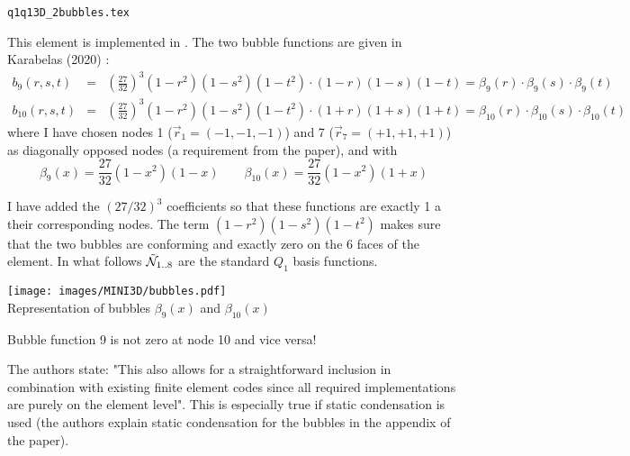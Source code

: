 \begin{flushright} {\tiny {\color{gray} \tt q1q13D\_2bubbles.tex}} \end{flushright}

This element is implemented in .
The two bubble functions are given in Karabelas \etal (2020) \cite{kahp20}:
\begin{eqnarray}
b_9(r,s,t) &=& \left(\frac{27}{32}\right)^3 (1-r^2)(1-s^2)(1-t^2) \cdot (1-r)(1-s)(1-t) 
= \beta_9(r)\cdot\beta_9(s) \cdot \beta_9(t) \nonumber\\
b_{10}(r,s,t) &=& \left(\frac{27}{32}\right)^3 (1-r^2)(1-s^2)(1-t^2) \cdot (1+r)(1+s)(1+t) 
= \beta_{10}(r)\cdot\beta_{10}(s) \cdot \beta_{10}(t)  \nonumber
\end{eqnarray}
where I have chosen nodes 1 ($\vec{r}_1=(-1,-1,-1)$) and 7 ($\vec{r}_7=(+1,+1,+1)$) 
as diagonally opposed nodes (a requirement from the paper), 
and with
\[
\beta_9(x)=\frac{27}{32} (1-x^2) (1-x)
\qquad
\beta_{10}(x)=\frac{27}{32} (1-x^2) (1+x)
\]

I have added the $(27/32)^3$ coefficients so that these functions are exactly 1 a their 
corresponding nodes.
The term $(1-r^2)(1-s^2)(1-t^2)$ makes sure that the two bubbles are conforming and exactly zero 
on the 6 faces of the element.
In what follows $\tilde{{\mathcal{N}}}_{1..8}$ are the standard $Q_1$ basis functions.

\begin{center}
\texttt{[image: images/MINI3D/bubbles.pdf]}\\
{\captionfont Representation of bubbles $\beta_9(x)$ and $\beta_{10}(x)$}
\end{center}

\begin{remark}
Bubble function 9 is not zero at node 10 and vice versa!
\end{remark}

The authors state: "This also allows for a straightforward inclusion in combination 
with existing finite element codes since all required
implementations are purely on the element level". This is especially true 
if static condensation is used (the authors explain static condensation 
for the bubbles in the appendix of the paper).

